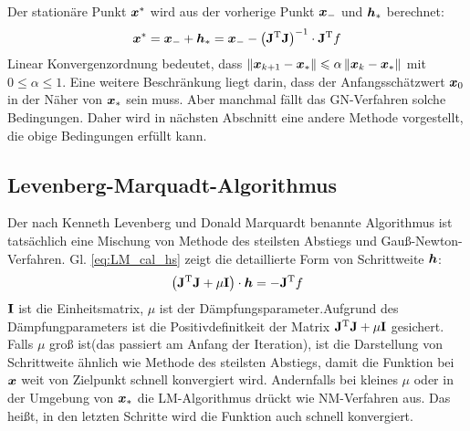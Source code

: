 Der stationäre Punkt $\boldsymbol x^{\ast}$ wird aus der vorherige Punkt $\boldsymbol x_{-}$ und $\boldsymbol h_{\ast}$ berechnet:
\begin{equation}
\boldsymbol x^{\ast} = \boldsymbol x_{-} + \boldsymbol h_{\ast} = \boldsymbol x_{-} - \left ( \mathbf{J}^\mathrm{T} \mathbf{J} \right )^\mathrm{-1} \cdot \mathbf{J}^\mathrm{T}f\label{eq:newton-xs}
\end{equation} 
Linear Konvergenzordnung bedeutet, dass $\left\|\boldsymbol x_{k+1} -\boldsymbol x_{\ast}\right\| \leqslant \alpha \left\|\boldsymbol x_{k}-\boldsymbol x_{\ast}\right\|$ mit $0 \leqslant \alpha \leqslant 1$. Eine weitere Beschränkung liegt darin, dass der Anfangsschätzwert $\boldsymbol x_{0}$ in der Näher von $\boldsymbol x_{\ast}$ sein muss. Aber manchmal fällt das GN-Verfahren solche Bedingungen. Daher wird in nächsten Abschnitt eine andere Methode vorgestellt, die obige Bedingungen erfüllt kann. 
\subsection{Levenberg-Marquadt-Algorithmus}
\label{Levenberg-Marquadt-Algorithmus}
Der nach Kenneth Levenberg und Donald Marquardt benannte Algorithmus ist tatsächlich eine Mischung von Methode des steilsten Abstiegs und Gauß-Newton-Verfahren. Gl. \ref{eq:LM_cal_hs} zeigt die detaillierte Form von Schrittweite $\boldsymbol h$\cite{madsen2004methods}\cite{von2015einfuhrung}:
\begin{equation}
\left ( \mathbf{J}^\mathrm{T} \mathbf{J} + \mu\mathbf{I}\right ) \cdot \boldsymbol h  = -\mathbf{J}^\mathrm{T}f
\label{eq:LM_cal_hs}
\end{equation}
$\mathbf{I}$ ist die Einheitsmatrix, $\mu$ ist der Dämpfungsparameter.Aufgrund des Dämpfungparameters ist die Positivdefinitkeit der Matrix $\mathbf{J}^\mathrm{T} \mathbf{J} + \mu\mathbf{I}$ gesichert. Falls $\mu$ groß ist(das passiert am Anfang der Iteration), ist die Darstellung von Schrittweite ähnlich wie Methode des steilsten Abstiegs, damit die Funktion bei $\boldsymbol x$ weit von Zielpunkt schnell konvergiert wird. Andernfalls bei kleines $\mu$ oder in der Umgebung von $\boldsymbol x_{\ast}$ die LM-Algorithmus drückt wie NM-Verfahren aus. Das heißt, in den letzten Schritte wird die Funktion auch schnell konvergiert.

